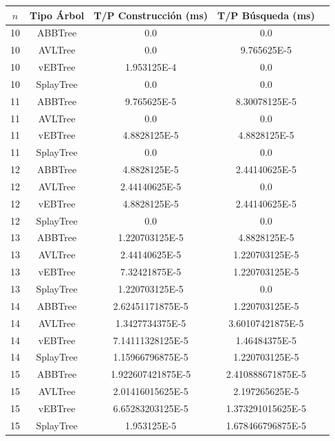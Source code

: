 \documentclass[letterpaper,12pt]{article}
\begin{document}
\begin{tabular}{|c|c|c|c|c|}
\hline
\textbf{$n$} & \textbf{Tipo Árbol} & \textbf{T/P Construcción (ms)} & \textbf{T/P Búsqueda (ms)} \\
\hline
10 & ABBTree & 0.0 & 0.0 \\
\hline
10 & AVLTree & 0.0 & 9.765625E-5 \\
\hline
10 & vEBTree & 1.953125E-4 & 0.0\\
\hline
10 & SplayTree & 0.0 & 0.0 \\
\hline
\hline
11 & ABBTree & 9.765625E-5 & 8.30078125E-5 \\
\hline
11 & AVLTree & 0.0 & 0.0 \\
\hline
11 & vEBTree & 4.8828125E-5 & 4.8828125E-5 \\
\hline
11 & SplayTree & 0.0 & 0.0 \\
\hline
\hline
12 & ABBTree & 4.8828125E-5 & 2.44140625E-5  \\
\hline
12 & AVLTree & 2.44140625E-5 & 0.0 \\
\hline
12 & vEBTree & 4.8828125E-5 & 2.44140625E-5\\
\hline
12 & SplayTree & 0.0 & 0.0 \\
\hline
\hline
13 & ABBTree & 1.220703125E-5 & 4.8828125E-5  \\
\hline
13 & AVLTree & 2.44140625E-5 & 1.220703125E-5 \\
\hline
13 & vEBTree & 7.32421875E-5 & 1.220703125E-5\\
\hline
13 & SplayTree & 1.220703125E-5 & 0.0 \\
\hline
\hline
14 & ABBTree & 2.62451171875E-5 & 1.220703125E-5 \\
\hline
14 & AVLTree & 1.3427734375E-5 & 3.60107421875E-5 \\
\hline
14 & vEBTree & 7.14111328125E-5 & 1.46484375E-5\\
\hline
14 & SplayTree & 1.15966796875E-5 & 1.220703125E-5 \\
\hline
\hline
15 & ABBTree & 1.922607421875E-5 & 2.410888671875E-5 \\
\hline
15 & AVLTree & 2.01416015625E-5 & 2.197265625E-5 \\
\hline
15 & vEBTree & 6.65283203125E-5  & 1.373291015625E-5\\
\hline
15 & SplayTree & 1.953125E-5  & 1.678466796875E-5 \\
\hline
\end{tabular}
\end{document}
